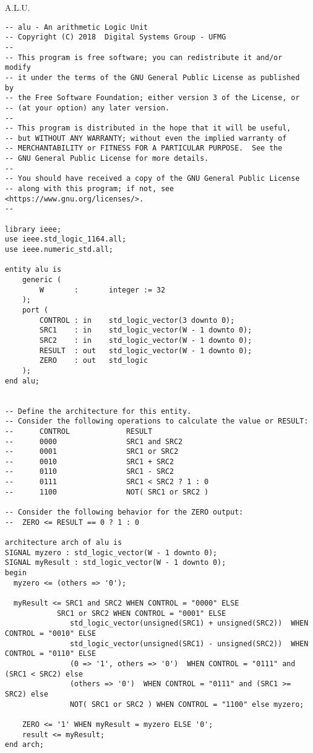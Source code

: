 \documentclass[12pt]{article}
\begin{document}
\Large

\begin{center}
A.L.U.
\end{center}

\normalsize

\begin{verbatim}
-- alu - An arithmetic Logic Unit
-- Copyright (C) 2018  Digital Systems Group - UFMG
--
-- This program is free software; you can redistribute it and/or modify
-- it under the terms of the GNU General Public License as published by
-- the Free Software Foundation; either version 3 of the License, or
-- (at your option) any later version.
--
-- This program is distributed in the hope that it will be useful,
-- but WITHOUT ANY WARRANTY; without even the implied warranty of
-- MERCHANTABILITY or FITNESS FOR A PARTICULAR PURPOSE.  See the
-- GNU General Public License for more details.
--
-- You should have received a copy of the GNU General Public License
-- along with this program; if not, see <https://www.gnu.org/licenses/>.
--

library ieee;
use ieee.std_logic_1164.all;
use ieee.numeric_std.all;

entity alu is
    generic (
        W       :       integer := 32
    );
    port (
        CONTROL : in    std_logic_vector(3 downto 0);
        SRC1    : in    std_logic_vector(W - 1 downto 0);
        SRC2    : in    std_logic_vector(W - 1 downto 0);
        RESULT  : out   std_logic_vector(W - 1 downto 0);
        ZERO    : out   std_logic
    );
end alu;


-- Define the architecture for this entity.
-- Consider the following operations to calculate the value or RESULT:
--      CONTROL             RESULT
--      0000                SRC1 and SRC2
--      0001                SRC1 or SRC2
--      0010                SRC1 + SRC2
--      0110                SRC1 - SRC2
--      0111                SRC1 < SRC2 ? 1 : 0
--      1100                NOT( SRC1 or SRC2 )

-- Consider the following behavior for the ZERO output:
--  ZERO <= RESULT == 0 ? 1 : 0

architecture arch of alu is
SIGNAL myzero : std_logic_vector(W - 1 downto 0);
SIGNAL myResult : std_logic_vector(W - 1 downto 0);
begin
  myzero <= (others => '0');

  myResult <= SRC1 and SRC2 WHEN CONTROL = "0000" ELSE
            SRC1 or SRC2 WHEN CONTROL = "0001" ELSE
	 		   std_logic_vector(unsigned(SRC1) + unsigned(SRC2))  WHEN CONTROL = "0010" ELSE
	 		   std_logic_vector(unsigned(SRC1) - unsigned(SRC2))  WHEN CONTROL = "0110" ELSE
	 		   (0 => '1', others => '0')  WHEN CONTROL = "0111" and (SRC1 < SRC2) else
	 		   (others => '0')  WHEN CONTROL = "0111" and (SRC1 >= SRC2) else
	 		   NOT( SRC1 or SRC2 ) WHEN CONTROL = "1100" else myzero;

	ZERO <= '1' WHEN myResult = myzero ELSE '0';
	result <= myResult;
end arch;

\end{verbatim}
\end{document}
